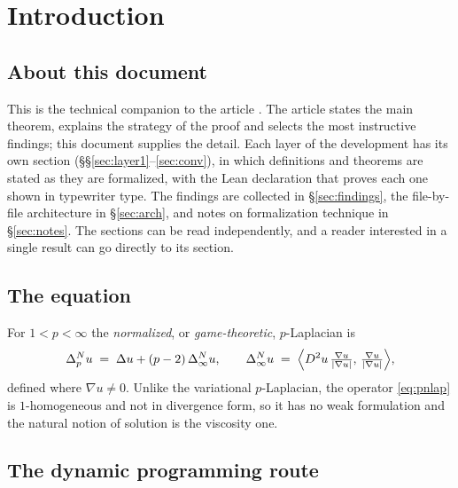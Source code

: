 \documentclass[11pt,reqno]{amsart}
\newcommand{\dlap}{\Delta}
\newcommand{\pnlap}{\Delta_p^{N}}
\newcommand{\inflap}{\Delta_\infty^{N}}
\DeclarePairedDelimiter{\abs}{\lvert}{\rvert}
\theoremstyle{plain}
\theoremstyle{definition}
\begin{document}
\maketitle

\section{Introduction}\label{sec:intro}

\subsection*{About this document}
This is the technical companion to the article \cite{MMart}. The article
states the main theorem, explains the strategy of the proof and selects the
most instructive findings; this document supplies the detail. Each layer of
the development has its own section (\S\S\ref{sec:layer1}--\ref{sec:conv}),
in which definitions and theorems are stated as they are formalized, with the
Lean declaration that proves each one shown in typewriter type. The findings
are collected in \S\ref{sec:findings}, the file-by-file architecture in
\S\ref{sec:arch}, and notes on formalization technique in
\S\ref{sec:notes}. The sections can be read independently, and a reader
interested in a single result can go directly to its section.

\subsection{The equation}

For $1 < p < \infty$ the \emph{normalized}, or \emph{game-theoretic},
$p$-Laplacian is
\begin{equation}\label{eq:pnlap}
  \pnlap u \;=\; \dlap u + (p-2)\,\inflap u,
  \qquad
  \inflap u \;=\; \Bigl\langle D^2 u \,\tfrac{\nabla u}{\abs{\nabla u}},\,
                             \tfrac{\nabla u}{\abs{\nabla u}} \Bigr\rangle,
\end{equation}
defined where $\nabla u \ne 0$. Unlike the variational $p$-Laplacian, the
operator \eqref{eq:pnlap} is $1$-homogeneous and not in divergence form, so it
has no weak formulation and the natural notion of solution is the viscosity
one.

\subsection{The dynamic programming route}
\end{document}
